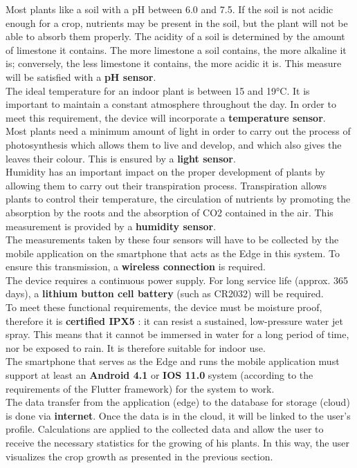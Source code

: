 Most plants like a soil with a pH between 6.0 and 7.5. If the soil is not acidic
enough for a crop, nutrients may be present in the soil, but the plant will not
be able to absorb them properly. The acidity of a soil is determined by the amount
of limestone it contains. The more limestone a soil contains, the more alkaline it is;
conversely, the less limestone it contains, the more acidic it is. This measure
will be satisfied with a \textbf{pH sensor}. \\
The ideal temperature for an indoor plant is between 15 and 19°C. It is important
to maintain a constant atmosphere throughout the day. In order to meet this requirement,
the device will incorporate a \textbf{temperature sensor}. \\
Most plants need a minimum amount of light in order to carry out the process of
photosynthesis which allows them to live and develop, and which also gives the
leaves their colour. This is ensured by a \textbf{light sensor}. \\
Humidity has an important impact on the proper development of plants by allowing
them to carry out their transpiration process. Transpiration allows plants to control
their temperature, the circulation of nutrients by promoting the absorption by the
roots and the absorption of CO2 contained in the air. This measurement is provided
by a \textbf{humidity sensor}. \\
The measurements taken by these four sensors will have to be collected by the mobile
application on the smartphone that acts as the Edge in this system. To ensure this
transmission, a \textbf{wireless connection} is required. \\
The device requires a continuous power supply. For long service life (approx. 365
days), a \textbf{lithium button cell battery} (such as CR2032) will be required. \\
To meet these functional requirements, the device must be moisture proof, therefore
it is \textbf{certified IPX5} : it can resist a sustained, low-pressure water jet
spray. This means that it cannot be immersed in water for a long period of time,
nor be exposed to rain. It is therefore suitable for indoor use. \\
The smartphone that serves as the Edge and runs the mobile application must support
at least an \textbf{Android 4.1} or \textbf{IOS 11.0} system (according to the requirements
of the Flutter framework) for the system to work. \\
The data transfer from the application (edge) to the database for storage (cloud)
is done via \textbf{internet}. Once the data is in the cloud, it will be linked to
the user's profile. Calculations are applied to the collected data and allow the
user to receive the necessary statistics for the growing of his plants. In this way,
the user visualizes the crop growth as presented in the previous section.
